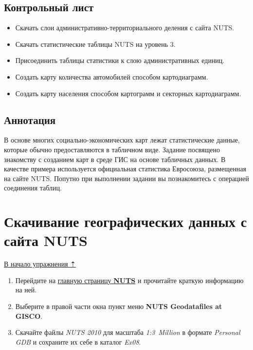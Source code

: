 \documentclass[12pt,]{book}
\providecommand{\tightlist}{%
  \setlength{\itemsep}{0pt}\setlength{\parskip}{0pt}}
\begin{document}
\hypertarget{stat-map-economic-control}{%
\subsection{Контрольный лист}\label{stat-map-economic-control}}

\begin{itemize}
\tightlist
\item
  Скачать слои административно-территориального деления с сайта NUTS.
\item
  Скачать статистические таблицы NUTS на уровень 3.
\item
  Присоединить таблицы статистики к слою административных единиц.
\item
  Создать карту количества автомобилей способом картодиаграмм.
\item
  Создать карту населения способом картограмм и секторных картодиаграмм.
\end{itemize}

\hypertarget{stat-map-economic-annotation}{%
\subsection{Аннотация}\label{stat-map-economic-annotation}}

В основе многих социально-экономических карт лежат статистические данные, которые обычно предоставляются в табличном виде. Задание посвящено знакомству с созданием карт в среде ГИС на основе табличных данных. В качестве примера используется официальная статистика Евросоюза, размещенная на сайте NUTS. Попутно при выполнении задании вы познакомитесь с операцией соединения таблиц.

\hypertarget{stat-map-economic-nuts-geo}{%
\section{Скачивание географических данных с сайта NUTS}\label{stat-map-economic-nuts-geo}}

\protect\hyperlink{stat-map-economic}{В начало упражнения ⇡}

\begin{enumerate}
\def\labelenumi{\arabic{enumi}.}
\item
  Перейдите на \href{http://epp.eurostat.ec.europa.eu/portal/page/portal/nuts_nomenclature/introduction}{главную страницу \textbf{NUTS}} и прочитайте краткую информацию на ней.
\item
  Выберите в правой части окна пункт меню \textbf{NUTS Geodatafiles at GISCO}.
\item
  Скачайте файлы \emph{NUTS 2010} для масштаба \emph{1:3~Million} в формате \emph{Personal GDB} и сохраните их себе в каталог \emph{Ex08}.
\end{enumerate}
\end{document}

